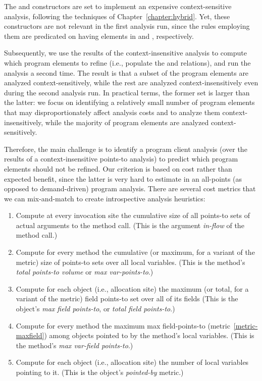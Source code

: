 The  and  constructors are set to implement an expensive context-sensitive analysis, following the techniques of Chapter~\ref{chapter:hybrid}. Yet, these constructors are not relevant in the first analysis run, since the rules employing them are predicated on having elements in  and , respectively.

Subsequently, we use the results of the context-insensitive analysis to compute which program elements to refine (i.e., populate the  and  relations), and run the analysis a second time. The result is that a subset of the program elements are analyzed context-sensitively, while the rest are analyzed context-insensitively even during the second analysis run. In practical terms, the former set is larger than the latter: we focus on identifying a relatively small number of program elements that may disproportionately affect analysis costs and to analyze them context-insensitively, while the majority of program elements are analyzed context-sensitively.

Therefore, the main challenge is to identify a program client analysis (over the results of a context-insensitive points-to analysis) to predict which program elements should not be refined. Our criterion is based on cost rather than expected benefit, since the latter is very hard to estimate in an all-points (as opposed to demand-driven) program analysis. There are several cost metrics that we can mix-and-match to create introspective analysis heuristics:

\begin{enumerate}
\item \label{metric-arginflow} Compute at every invocation site the cumulative size of all points-to sets of actual arguments to the method call. (This is the argument \emph{in-flow} of the method call.)

\item \label{metric-methvpt} Compute for every method the cumulative (or maximum, for a variant of the metric) size of points-to sets over all local variables. (This is the method's \emph{total points-to volume} or \emph{max var-points-to}.)

\item \label{metric-maxfield} Compute for each object (i.e., allocation site) the maximum (or total, for a variant of the metric) field points-to set over all of its fields (This is the object's \emph{max field points-to}, or \emph{total field points-to}.)

\item \label{metric-methodmaxfield} Compute for every method the maximum max field-points-to (metric~\ref{metric-maxfield}) among objects pointed to by the method's local variables. (This is the method's \emph{max var-field points-to}.)

\item \label{metric-pointedby} Compute for each object (i.e., allocation site) the number of local variables pointing to it. (This is the object's \emph{pointed-by} metric.)
\end{enumerate}


